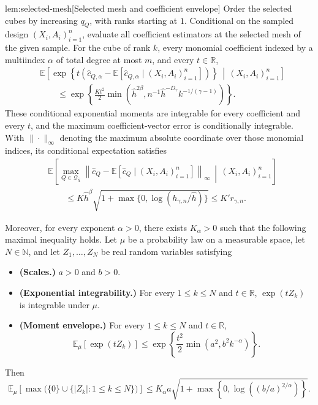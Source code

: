\documentclass[11pt]{article}
\begin{document}
\begin{lemmav}{lem:selected-mesh}[Selected mesh and coefficient envelope]
Order the selected cubes by increasing \(q_Q\), with ranks starting at \(1\). Conditional on the sampled design \((X_i,A_i)_{i=1}^n\), evaluate all coefficient estimators at the selected mesh of the given sample. For the cube of rank \(k\), every monomial coefficient indexed by a multiindex \(\alpha\) of total degree at most \(m\), and every \(t\in\mathbb R\),
\[
\begin{aligned}
&\mathbb E\!\left[
\exp\!\left\{
t\left(
\widehat c_{Q,\alpha}
-\mathbb E[\widehat c_{Q,\alpha}\mid(X_i,A_i)_{i=1}^n]
\right)
\right\}
\,\middle|\,(X_i,A_i)_{i=1}^n
\right]
\\
&\hspace{2em}\le
\exp\!\left\{
\frac{Kt^2}{2}
\min\!\left(
\widehat h^{2\beta},
n^{-1}\widehat h^{-D_\gamma}k^{-1/(\gamma-1)}
\right)
\right\}.
\end{aligned}
\]
These conditional exponential moments are integrable for every coefficient and every \(t\), and the maximum coefficient-vector error is conditionally integrable. With \(\|\cdot\|_\infty\) denoting the maximum absolute coordinate over those monomial indices, its conditional expectation satisfies
\[
\begin{aligned}
&\mathbb E\!\left[
\max_{Q\in\mathcal Q_{\widehat h}}
\left\|
\widehat c_Q-
\mathbb E[\widehat c_Q\mid(X_i,A_i)_{i=1}^n]
\right\|_\infty
\,\middle|\,(X_i,A_i)_{i=1}^n
\right]
\\
&\hspace{2em}\le
K\widehat h^\beta
\sqrt{1+\max\{0,\log(h_{\gamma,n}/\widehat h)\}}
\le K'r_{\gamma,n}.
\end{aligned}
\]

Moreover, for every exponent \(\alpha>0\), there exists \(K_\alpha>0\) such that the following maximal inequality holds. Let \(\mu\) be a probability law on a measurable space, let \(N\in\mathbb N\), and let \(Z_1,\ldots,Z_N\) be real random variables satisfying
\begin{itemize}
\item \textbf{(Scales.)} \(a>0\) and \(b>0\).
\item \textbf{(Exponential integrability.)} For every \(1\le k\le N\) and \(t\in\mathbb R\), \(\exp(tZ_k)\) is integrable under \(\mu\).
\item \textbf{(Moment envelope.)} For every \(1\le k\le N\) and \(t\in\mathbb R\),
\[
\mathbb E_\mu[\exp(tZ_k)]
\le
\exp\!\left\{
\frac{t^2}{2}\min(a^2,b^2k^{-\alpha})
\right\}.
\]
\end{itemize}
Then
\[
\mathbb E_\mu\!\left[
\max\bigl(\{0\}\cup\{|Z_k|:1\le k\le N\}\bigr)
\right]
\le
K_\alpha a
\sqrt{1+\max\!\left\{0,\log\!\left((b/a)^{2/\alpha}\right)\right\}}.
\]
\end{lemmav}
\end{document}
